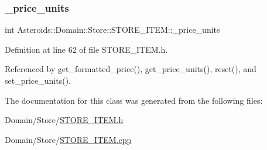 \subsubsection{\texorpdfstring{\+\_\+price\+\_\+units}{\_price\_units}}
{\footnotesize\ttfamily int Asteroids\+::\+Domain\+::\+Store\+::\+S\+T\+O\+R\+E\+\_\+\+I\+T\+E\+M\+::\+\_\+price\+\_\+units\hspace{0.3cm}{\ttfamily [private]}}



Definition at line 62 of file S\+T\+O\+R\+E\+\_\+\+I\+T\+E\+M.\+h.



Referenced by get\+\_\+formatted\+\_\+price(), get\+\_\+price\+\_\+units(), reset(), and set\+\_\+price\+\_\+units().



The documentation for this class was generated from the following files\+:\begin{DoxyCompactItemize}
\item 
Domain/\+Store/\hyperlink{STORE__ITEM_8h}{S\+T\+O\+R\+E\+\_\+\+I\+T\+E\+M.\+h}\item 
Domain/\+Store/\hyperlink{STORE__ITEM_8cpp}{S\+T\+O\+R\+E\+\_\+\+I\+T\+E\+M.\+cpp}\end{DoxyCompactItemize}
